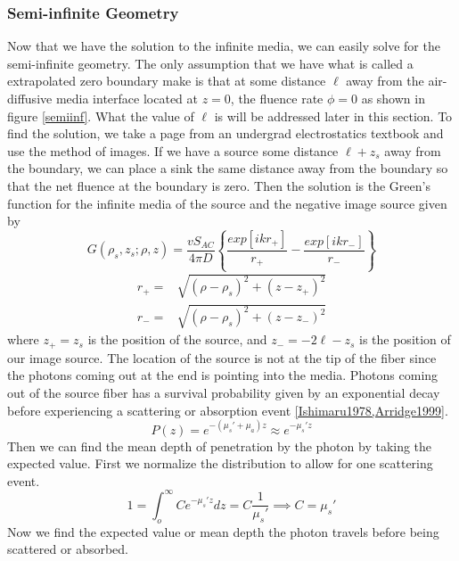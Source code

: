 \subsubsection{Semi-infinite Geometry}
Now that we have the solution to the infinite media, we can easily solve for the semi-infinite geometry. The only assumption that we have what is called a extrapolated zero boundary  make is that at some distance $\ell$ away from the air-diffusive media interface located at $z=0$, the fluence rate $\phi=0$ as shown in figure \ref{semiinf}. What the value of $\ell$ is will be addressed later in this section. 
To find the solution, we take a page from an undergrad electrostatics textbook and use the method of images. If we have a source some distance $\ell + z_s$ away from the boundary, we can place a sink the same distance away from the boundary so that the net fluence at the boundary is zero. Then the solution is the Green's function for the infinite media of the source and the negative image source given by
\begin{equation}
\label{semisoln}
G(\rho_s,z_s;\rho,z) = \frac{vS_{AC}}{4\pi D} \left\{ \frac{exp[ikr_+]}{r_+} 
- \frac{exp[ikr_-]}{r_-} \right\} \nonumber
\end{equation}
\begin{eqnarray}
\label{ext_both}
r_{+} = & \sqrt{(\rho-\rho_s)^2+(z-z_{+})^2} \nonumber \\
r_{-} = & \sqrt{(\rho-\rho_s)^2+(z-z_{-})^2}
\end{eqnarray}
\noindent
where $z_+=z_s$ is the position of the source, and $z_-=-2\ell-z_s$ is the position of our image source. The location of the source is not at the tip of the fiber since the photons coming out at the end is pointing into the media. Photons coming out of the source fiber has a survival probability given by an exponential decay before experiencing a scattering or absorption event \ref{Ishimaru1978,Arridge1999}.
\noindent
\begin{equation}
\label{scatterprob}
  P(z) = e^{-(\mu_s'+\mu_a)z} \approx e^{-\mu_s'z}
\end{equation}
\noindent
Then we can find the mean depth of penetration by the photon by taking the expected value. First we normalize the distribution to allow for one scattering event.
\noindent
\begin{equation}
  1 = \int_o^\infty C e^{-\mu_s'z}dz = C \frac{1}{\mu_s'} \implies C = \mu_s'
\end{equation}  
\noindent
Now we find the expected value or mean depth the photon travels before being scattered or absorbed.
